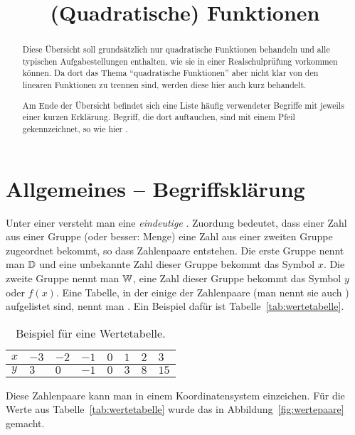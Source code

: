\documentclass{arbeitsblatt}
\title{(Quadratische) Funktionen}
\begin{document}
\maketitle

\begin{abstract}
  Diese Übersicht soll grundsätzlich nur quadratische Funktionen behandeln und
  alle typischen Aufgabestellungen enthalten, wie sie in einer
  Realschulprüfung vorkommen können.  Da dort das Thema "`quadratische
  Funktionen"' aber nicht klar von den linearen Funktionen zu trennen sind,
  werden diese hier auch kurz behandelt.
  
  Am Ende der Übersicht befindet sich eine Liste häufig verwendeter Begriffe
  mit jeweils einer kurzen Erklärung.  Begriff, die dort auftauchen, sind mit
  einem Pfeil gekennzeichnet, so wie hier .
\end{abstract}

\tableofcontents

\section{Allgemeines -- Begriffsklärung}

Unter einer  versteht man eine \emph{eindeutige}
.  Zuordung bedeutet, dass einer Zahl aus einer Gruppe
(oder besser: Menge) eine Zahl aus einer zweiten Gruppe zugeordnet bekommt, so
dass Zahlenpaare entstehen.  Die erste Gruppe nennt man
 $\mathbb{D}$ und eine unbekannte Zahl dieser Gruppe
bekommt das Symbol $x$.  Die zweite Gruppe nennt man 
$\mathbb{W}$, eine Zahl dieser Gruppe bekommt das Symbol $y$ oder $f(x)$.  Eine
Tabelle, in der einige der Zahlenpaare (man nennt sie auch )
aufgelistet sind, nennt man .  Ein Beispiel dafür ist
Tabelle~\vref{tab:wertetabelle}.

\begin{table}
  \centering
  \caption{Beispiel für eine Wertetabelle.}
  \label{tab:wertetabelle}
\end{table}

Diese Zahlenpaare kann man in einem Koordinatensystem einzeichen.  Für die
Werte aus Tabelle~\vref{tab:wertetabelle} wurde das in
Abbildung~\vref{fig:wertepaare} gemacht.
\end{document}
